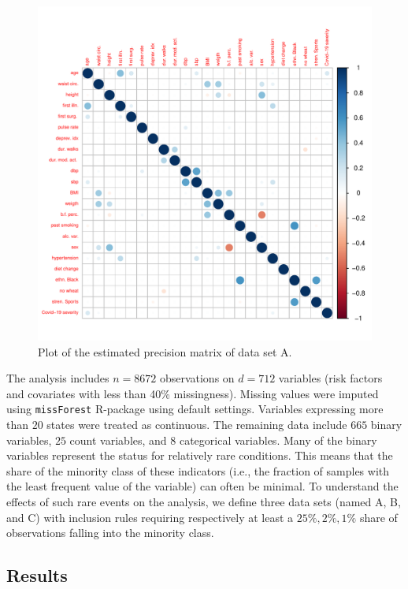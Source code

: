 \begin{figure}[ht]
    \centering
    \includegraphics[scale=.6]{Figures/corrplot_omega_A.pdf}
    \caption{Plot of the estimated precision matrix of data set A.}
    \label{fig:corrplot_omega_A}
\end{figure}
The analysis includes $n=8672$ observations on $d=712$ variables (risk factors and covariates with less than 40\% missingness). Missing values were imputed using \texttt{missForest} R-package using default settings. Variables expressing more than $20$ states were treated as continuous. The remaining data include $665$ binary variables, $25$ count variables, and $8$ categorical variables. Many of the binary variables represent the status for relatively rare conditions. This means that the share of the minority class of these indicators (i.e., the fraction of samples with the least frequent value of the variable) can often be minimal. To understand the effects of such rare events on the analysis, we define
three data sets (named A, B, and C) with inclusion rules requiring respectively at least a $25\%, 2\%, 1\%$ share of observations falling into the minority class.

\subsection{Results}

